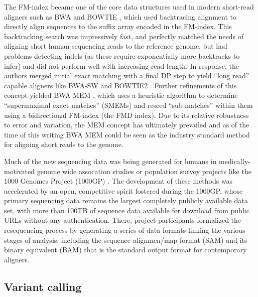 The FM-index became one of the core data structures used in modern short-read aligners such as BWA \cite{li2009fast} and BOWTIE \cite{langmead2009ultrafast}, which used backtracing alignment to directly align sequences to the suffix array encoded in the FM-index.
This backtracking search was impressively fast, and perfectly matched the needs of aligning short human sequencing reads to the reference genome, but had problems detecting indels (as these require exponentially more backtracks to infer) and did not perform well with increasing read length.
In response, the authors merged initial exact matching with a final DP step to yield ``long read'' capable aligners like BWA-SW \cite{li2010fast} and BOWTIE2 \cite{langmead2012fast}.
Further refinements of this concept yielded BWA MEM \cite{li2013aligning}, which uses a heuristic algorithm to determine ``supermaximal exact matches'' (SMEMs) and reseed ``sub matches'' within them using a bidirectional FM-index (the FMD index).
Due to its relative robustness to error and variation, the MEM concept has ultimately prevailed and as of the time of this writing BWA MEM could be seen as the industry standard method for aligning short reads to the genome.

Much of the new sequencing data was being generated for humans in medically-motivated genome wide assocation studies \cite{uk10k2015uk10k} or population survey projects like the 1000 Genomes Project (1000GP) \cite{1000Gphase1,1000g2015}.
The development of these methods was accelerated by an open, competitive spirit fostered during the 1000GP, whose primary sequencing data remains the largest completely publicly available data set, with more than 100TB of sequence data available for download from public URLs without any authentication.
There, project participants formalized the resequencing process by generating a series of data formats linking the various stages of analysis, including the sequence alignmen/map format (SAM) and its binary equivalent (BAM) \cite{li2009sequence} that is the standard output format for contemporary aligners.


\subsection{Variant calling}

